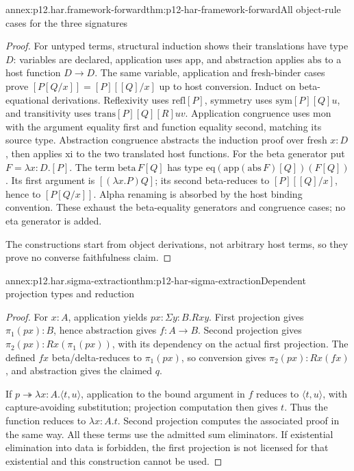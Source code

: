 \begin{annexitem}{annex:p12.har.framework-forward}{thm:p12-har-framework-forward}{All object-rule cases for the three signatures}
\begin{proof}
For untyped terms, structural induction shows their translations have
type \(D\): variables are declared, application uses \(\mathrm{app}\),
and abstraction applies \(\mathrm{abs}\) to a host function
\(D\to D\). The same variable, application and fresh-binder
cases prove \([P[Q/x]]=[P][[Q]/x]\) up to host conversion.
Induct on beta-equational derivations. Reflexivity uses
\(\mathrm{refl}[P]\), symmetry uses
\(\mathrm{sym}[P][Q]u\), and transitivity uses
\(\mathrm{trans}[P][Q][R]uv\). Application congruence uses
\(\mathrm{mon}\) with the argument equality first and function
equality second, matching its source type. Abstraction congruence
abstracts the induction proof over fresh \(x:D\), then applies
\(\mathrm{xi}\) to the two translated host functions. For the beta
generator put \(F=\lambda x:D.[P]\). The term
\(\mathrm{beta}\,F[Q]\) has type
\(\mathrm{eq}(\mathrm{app}(\mathrm{abs}\,F)[Q])(F[Q])\).
Its first argument is \([(\lambda x.P)Q]\); its second
beta-reduces to \([P][[Q]/x]\), hence to \([P[Q/x]]\).
Alpha renaming is absorbed by the host binding convention. These exhaust
the beta-equality generators and congruence cases; no eta generator is added.

The constructions start from object derivations, not arbitrary host terms,
so they prove no converse faithfulness claim.
\end{proof}
\end{annexitem}

\begin{annexitem}{annex:p12.har.sigma-extraction}{thm:p12-har-sigma-extraction}{Dependent projection types and reduction}
\begin{proof}
For \(x:A\), application yields \(px:\Sigma y:B.Rxy\).
First projection gives \(\pi_1(px):B\), hence abstraction gives
\(f:A\to B\). Second projection gives
\(\pi_2(px):Rx(\pi_1(px))\), with its dependency on the actual
first projection. The defined \(fx\) beta/delta-reduces to
\(\pi_1(px)\), so conversion gives \(\pi_2(px):Rx(fx)\),
and abstraction gives the claimed \(q\).

If \(p\twoheadrightarrow\lambda x:A.\langle t,u\rangle\),
application to the bound argument in \(f\) reduces to
\(\langle t,u\rangle\), with capture-avoiding substitution;
projection computation then gives \(t\). Thus the function reduces
to \(\lambda x:A.t\). Second projection computes the associated
proof in the same way. All these terms use the admitted sum eliminators.
If existential elimination into data is forbidden, the first projection
is not licensed for that existential and this construction cannot be used.
\end{proof}
\end{annexitem}

